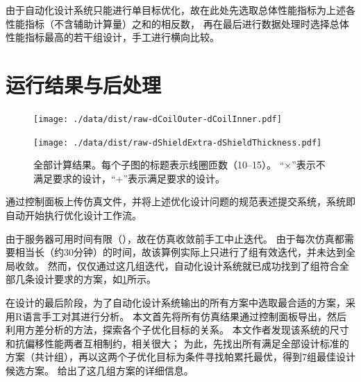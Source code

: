 \documentclass[index]{subfiles}
\begin{document}
由于自动化设计系统只能进行单目标优化，故在此处先选取总体性能指标为上述各性能指标（不含辅助计算量）之和的相反数，
再在最后进行数据处理时选择总体性能指标最高的若干组设计，手工进行横向比较。

\section{运行结果与后处理}
\begin{figure}[p]
  \centering%
    {\texttt{[image: ./data/dist/raw-dCoilOuter-dCoilInner.pdf]}}\par
    {\texttt{[image: ./data/dist/raw-dShieldExtra-dShieldThickness.pdf]}}
  \caption[全部计算结果]{全部计算结果。每个子图的标题表示线圈匝数（\numrange{10}{15}）。
  “$\times$”表示不满足要求的设计，“+”表示满足要求的设计。\label{fig:example-res}}
\end{figure}
通过控制面板上传仿真文件，并将上述优化设计问题的规范表述提交系统，系统即自动开始执行优化设计工作流。

由于服务器可用时间有限（\exmHour{}），故在仿真收敛前手工中止迭代。
由于每次仿真都需要相当长（约30分钟）的时间，故该算例实际上只进行了\exmValid{}组有效迭代，并未达到全局收敛。
然而，仅仅通过这几组迭代，自动化设计系统就已成功找到了\exmFea{}组符合全部几条设计要求的方案，如\cref{fig:example-res}所示。

在设计的最后阶段，为了自动化设计系统输出的所有方案中选取最合适的方案，采用R语言手工对其进行分析。
本文首先将所有仿真结果通过控制面板导出，然后利用方差分析的方法，探索各个子优化目标的关系。
本文作者发现该系统的尺寸和抗偏移性能两者互相制约，相关很大；
为此，先找出所有满足全部设计标准的方案（共计\exmValid{}组），再以这两个子优化目标为条件寻找帕累托最优，得到7组最佳设计候选方案。
给出了这几组方案的详细信息。
\begin{table}[htbp]
  \centering
  \caption[最佳设计方案候选]{最佳设计方案候选。
  其中长度单位\si{\milli\metre}，电感单位\si{\micro\henry}，电阻单位\si{\milli\ohm}。\label{tbl:example-opt}}
  \exmOptTable
\end{table}
\end{document}
